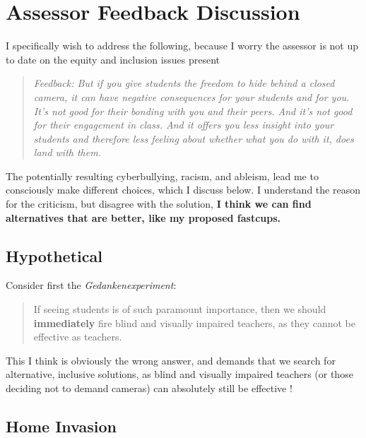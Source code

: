 \documentclass[paper=a4,justified,a4paper]{tufte-handout}
\begin{document}
\hypertarget{assessor-feedback-discussion}{%
\section{Assessor Feedback
Discussion}\label{assessor-feedback-discussion}}

I specifically wish to address the following, because I worry the
assessor is not up to date on the equity and inclusion issues present

\begin{quote}
\emph{Feedback: But if you give students the freedom to hide behind a
closed camera, it can have negative consequences for your students and
for you. It's not good for their bonding with you and their peers. And
it's not good for their engagement in class. And it offers you less
insight into your students and therefore less feeling about whether what
you do with it, does land with them.}
\end{quote}

The potentially resulting cyberbullying, racism, and ableism, lead me to
consciously make different choices, which I discuss below. I understand
the reason for the criticism, but disagree with the solution, \textbf{I
think we can find alternatives that are better, like my proposed
fastcups.}

\hypertarget{hypothetical}{%
\subsection{Hypothetical}\label{hypothetical}}

Consider first the \emph{Gedankenexperiment}:

\begin{quote}
If seeing students is of such paramount importance, then we should
\textbf{immediately} fire blind and visually impaired teachers, as they
cannot be effective as teachers.
\end{quote}

This I think is obviously the wrong answer, and demands that we search
for alternative, inclusive solutions, as blind and visually impaired
teachers (or those deciding not to demand cameras) can absolutely still
be effective \citep{afzal2021sighted}!

\hypertarget{home-invasion}{%
\subsection{Home Invasion}\label{home-invasion}}
\end{document}
